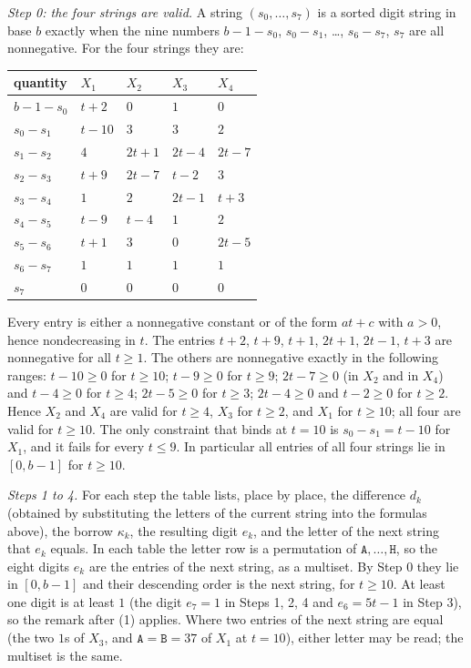 \documentclass[11pt,letterpaper]{article}
\theoremstyle{paperstyle}
\theoremstyle{paperstyledef}
\theoremstyle{paperstylerem}
\begin{document}
\emph{Step 0: the four strings are valid.} A string \((s_0, \dots, s_7)\) is a sorted digit string in base \(b\) exactly when the nine numbers \(b-1-s_0\), \(s_0-s_1\), \ldots, \(s_6-s_7\), \(s_7\) are all nonnegative. For the four strings they are:

{\def\LTcaptype{none} %
\begin{longtable}[]{@{}lllll@{}}
\toprule\noalign{}
quantity & \(X_1\) & \(X_2\) & \(X_3\) & \(X_4\) \\
\midrule\noalign{}
\endhead
\bottomrule\noalign{}
\endlastfoot
\(b-1-s_0\) & \(t+2\) & \(0\) & \(1\) & \(0\) \\
\(s_0-s_1\) & \(t-10\) & \(3\) & \(3\) & \(2\) \\
\(s_1-s_2\) & \(4\) & \(2t+1\) & \(2t-4\) & \(2t-7\) \\
\(s_2-s_3\) & \(t+9\) & \(2t-7\) & \(t-2\) & \(3\) \\
\(s_3-s_4\) & \(1\) & \(2\) & \(2t-1\) & \(t+3\) \\
\(s_4-s_5\) & \(t-9\) & \(t-4\) & \(1\) & \(2\) \\
\(s_5-s_6\) & \(t+1\) & \(3\) & \(0\) & \(2t-5\) \\
\(s_6-s_7\) & \(1\) & \(1\) & \(1\) & \(1\) \\
\(s_7\) & \(0\) & \(0\) & \(0\) & \(0\) \\
\end{longtable}
}

Every entry is either a nonnegative constant or of the form \(at + c\) with \(a > 0\), hence nondecreasing in \(t\). The entries \(t+2\), \(t+9\), \(t+1\), \(2t+1\), \(2t-1\), \(t+3\) are nonnegative for all \(t \geq 1\). The others are nonnegative exactly in the following ranges: \(t - 10 \geq 0\) for \(t \geq 10\); \(t - 9 \geq 0\) for \(t \geq 9\); \(2t - 7 \geq 0\) (in \(X_2\) and in \(X_4\)) and \(t - 4 \geq 0\) for \(t \geq 4\); \(2t - 5 \geq 0\) for \(t \geq 3\); \(2t - 4 \geq 0\) and \(t - 2 \geq 0\) for \(t \geq 2\). Hence \(X_2\) and \(X_4\) are valid for \(t \geq 4\), \(X_3\) for \(t \geq 2\), and \(X_1\) for \(t \geq 10\); all four are valid for \(t \geq 10\). The only constraint that binds at \(t = 10\) is \(s_0 - s_1 = t - 10\) for \(X_1\), and it fails for every \(t \leq 9\). In particular all entries of all four strings lie in \([0, b-1]\) for \(t \geq 10\).

\emph{Steps 1 to 4.} For each step the table lists, place by place, the difference \(d_k\) (obtained by substituting the letters of the current string into the formulas above), the borrow \(\kappa_k\), the resulting digit \(e_k\), and the letter of the next string that \(e_k\) equals. In each table the letter row is a permutation of \(\mathtt{A}, \dots, \mathtt{H}\), so the eight digits \(e_k\) are the entries of the next string, as a multiset. By Step 0 they lie in \([0, b-1]\) and their descending order is the next string, for \(t \geq 10\). At least one digit is at least \(1\) (the digit \(e_7 = 1\) in Steps 1, 2, 4 and \(e_6 = 5t - 1\) in Step 3), so the remark after (1) applies. Where two entries of the next string are equal (the two \(1\)s of \(X_3\), and \(\mathtt{A} = \mathtt{B} = 37\) of \(X_1\) at \(t = 10\)), either letter may be read; the multiset is the same.
\end{document}
